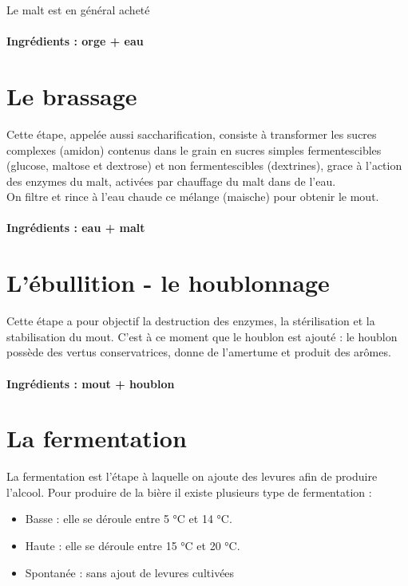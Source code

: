 \documentclass{report}
\begin{document}
Le malt est en général acheté
\paragraph{Ingrédients : orge + eau}

\section{Le brassage}

Cette étape, appelée aussi saccharification, consiste à transformer les sucres complexes (amidon) contenus dans le grain en sucres simples fermentescibles (glucose, maltose et dextrose) et non fermentescibles (dextrines), grace à l'action des enzymes du malt, activées par chauffage du malt dans de l'eau.\\
On filtre et rince à l'eau chaude ce mélange (maische) pour obtenir le mout. 

\paragraph{Ingrédients : eau + malt}


\section{L'ébullition - le houblonnage}

Cette étape a pour objectif la destruction des enzymes, la stérilisation et la stabilisation du mout.
C'est à ce moment que le houblon est ajouté : le houblon possède des vertus conservatrices, donne de l'amertume et produit des arômes.


\paragraph{Ingrédients : mout + houblon}

\section{La fermentation}
La fermentation est l'étape à laquelle on ajoute des levures afin de produire l'alcool. Pour produire de la bière il existe plusieurs type de fermentation :
\begin{itemize}
\item  Basse : elle se déroule entre 5 °C et 14 °C.
\item    Haute : elle se déroule entre 15 °C et 20 °C.
\item   Spontanée : sans ajout de levures cultivées
\end{itemize}
   
\end{document}
